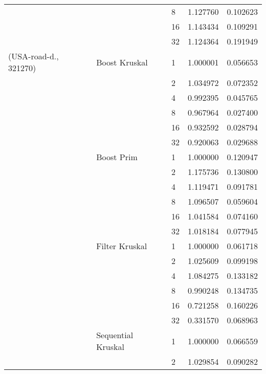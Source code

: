 \begin{tabular}{lllrr}
                       &                    & 8  &  1.127760 &  0.102623 \\
                       &                    & 16 &  1.143434 &  0.109291 \\
                       &                    & 32 &  1.124364 &  0.191949 \\
(USA-road-d., 321270) & Boost Kruskal & 1  &  1.000001 &  0.056653 \\
                       &                    & 2  &  1.034972 &  0.072352 \\
                       &                    & 4  &  0.992395 &  0.045765 \\
                       &                    & 8  &  0.967964 &  0.027400 \\
                       &                    & 16 &  0.932592 &  0.028794 \\
                       &                    & 32 &  0.920063 &  0.029688 \\
                       & Boost Prim & 1  &  1.000000 &  0.120947 \\
                       &                    & 2  &  1.175736 &  0.130800 \\
                       &                    & 4  &  1.119471 &  0.091781 \\
                       &                    & 8  &  1.096507 &  0.059604 \\
                       &                    & 16 &  1.041584 &  0.074160 \\
                       &                    & 32 &  1.018184 &  0.077945 \\
                       & Filter Kruskal & 1  &  1.000000 &  0.061718 \\
                       &                    & 2  &  1.025609 &  0.099198 \\
                       &                    & 4  &  1.084275 &  0.133182 \\
                       &                    & 8  &  0.990248 &  0.134735 \\
                       &                    & 16 &  0.721258 &  0.160226 \\
                       &                    & 32 &  0.331570 &  0.068963 \\
                       & Sequential Kruskal & 1  &  1.000000 &  0.066559 \\
                       &                    & 2  &  1.029854 &  0.090282 \\

\end{tabular}
